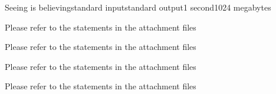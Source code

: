 \begin{problem}{Seeing is believing}{standard input}{standard output}{1 second}{1024 megabytes}

Please refer to the statements in the attachment files

\InputFile
Please refer to the statements in the attachment files

\OutputFile
Please refer to the statements in the attachment files

\Examples

\begin{example}
%
%
\end{example}

\Note
Please refer to the statements in the attachment files

\end{problem}

